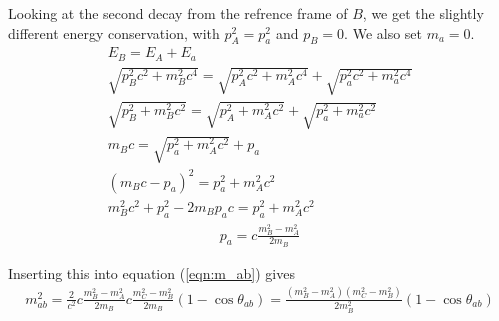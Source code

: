 \documentclass[12p,a4paper]{article}
\begin{document}
Looking at the second decay from the refrence frame of $B$, we get the slightly different energy conservation, with $p_A^2 = p_a^2$ and $p_B = 0$. We also set $m_a = 0$.
\begin{gather*}
    E_B = E_A + E_a \\
    \sqrt{p_B^2c^2 + m_B^2c^4} = \sqrt{p_A^2c^2 + m_A^2c^4} + \sqrt{p_a^2c^2 + m_a^2c^4} \\
    \sqrt{p_B^2 + m_B^2c^2} = \sqrt{p_A^2 + m_A^2c^2} + \sqrt{p_a^2 + m_a^2c^2} \\
    m_Bc = \sqrt{p_a^2 + m_A^2c^2} + p_a \\
    (m_Bc - p_a)^2 = p_a^2 + m_A^2c^2 \\
    m_B^2c^2+ p_a^2 - 2m_Bp_ac = p_a^2 + m_A^2c^2
\end{gather*}
\begin{gather}
    p_a = c\frac{m_B^2 - m_A^2}{2m_B}
\end{gather}

Inserting this into equation (\ref{eqn:m_ab}) gives
\begin{align*}
    m_{ab}^2 = \frac{2}{c^2}c\frac{m_B^2 - m_A^2}{2m_B}c\frac{m_C^2 - m_B^2}{2m_B}(1-\cos{\theta_{ab}}) = \frac{(m_B^2 - m_A^2)(m_C^2 - m_B^2)}{2m_B^2}(1-\cos{\theta_{ab}})
\end{align*}
\end{document}
